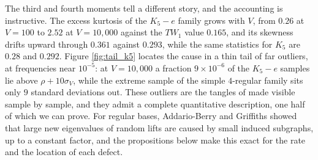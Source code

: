 \documentclass[12pt,oneside,english]{amsart}
\numberwithin{equation}{section}
\numberwithin{figure}{section}
\numberwithin{table}{section}
\theoremstyle{plain}
\numberwithin{thm}{section}
\theoremstyle{plain}
\theoremstyle{plain}
\theoremstyle{plain}
\theoremstyle{definition}
\theoremstyle{definition}
\theoremstyle{definition}
\theoremstyle{remark}
\begin{document}
The third and fourth moments tell a different story, and the accounting
is instructive. The excess kurtosis of the $K_{5}-e$ family grows
with $V$, from $0.26$ at $V=100$ to $2.52$ at $V=10{,}000$ against
the $TW_{1}$ value $0.165$, and its skewness drifts upward through
$0.361$ against $0.293$, while the same statistics for $K_{5}$ are
$0.28$ and $0.292$. Figure \ref{fig:tail_k5} locates the cause
in a thin tail of far outliers, at frequencies near $10^{-5}$: at
$V=10{,}000$ a fraction $9\times10^{-6}$ of the $K_{5}-e$ samples
lie above $\rho+10\sigma_{V}$, while the extreme sample of the simple
$4$-regular family sits only $9$ standard deviations out. These
outliers are the tangles of \cite{Friedman2008} made visible sample
by sample, and they admit a complete quantitative description, one
half of which we can prove. For regular bases, Addario-Berry and Griffiths
\cite{AddarioBerryGriffiths2010} showed that large new eigenvalues
of random lifts are caused by small induced subgraphs, up to a constant
factor, and the propositions below make this exact for the rate and
the location of each defect.
\end{document}
